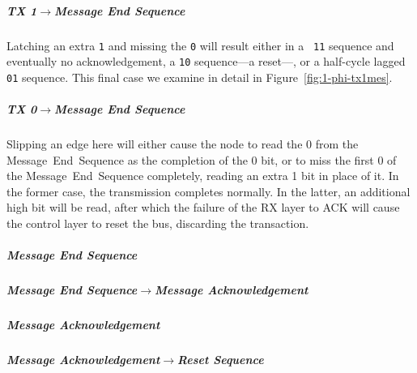 \subparagraph{TX 1$\rightarrow$Message End Sequence}
Latching an extra {\tt 1} and missing the {\tt 0} will result either in a {\tt
11} sequence and eventually no acknowledgement, a {\tt 10} sequence---a
reset---, or a half-cycle lagged {\tt 01} sequence. This final case we examine
in detail in Figure~\ref{fig:1-phi-tx1mes}.

\subparagraph{TX 0$\rightarrow$Message End Sequence}
Slipping an edge here will either cause the node to read the 0 from the
Message~End~Sequence as the completion of the 0 bit, or to miss the first 0 of
the Message~End~Sequence completely, reading an extra 1 bit in place of it. In
the former case, the transmission completes normally. In the latter, an
additional high bit will be read, after which the failure of the RX layer to
ACK will cause the control layer to reset the bus, discarding the transaction.

\subparagraph{Message End Sequence}

\subparagraph{Message End Sequence$\rightarrow$Message Acknowledgement}

\subparagraph{Message Acknowledgement}

\subparagraph{Message Acknowledgement$\rightarrow$Reset Sequence}


